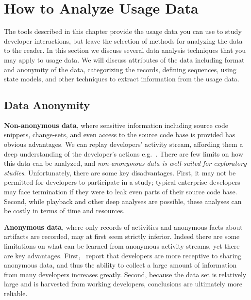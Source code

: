\section{How to Analyze Usage Data}

The tools described in this chapter provide the usage data you can use to study developer interactions, but leave the selection of methods for analyzing the data to the reader.  In this section we discuss several data analysis techniques that you may apply to usage data.  We will discuss attributes of the data including format and anonymity of the data, categorizing the records, defining sequences, using state models, and other techniques to extract information from the usage data. 

\label{sec:dataAnonymity}
\subsection{Data Anonymity}

\noindent
{\bf Non-anonymous data}, where sensitive information including source code snippets, change-sets, and even access to the source code base is provided has obvious advantages. We can replay developers' activity stream, affording them a deep understanding of the developer's actions e.g.~\citep{VakilianETAL2012UseDisuseMisuse}. There are few limits on how this data can be analyzed, and {\em non-anonymous data is well-suited for exploratory studies}. Unfortunately, there are some key disadvantages. First, it may not be permitted for developers to participate in a study; typical enterprise developers may face termination if they were to leak even parts of their source code base. Second, while playback and other deep analyses are possible, these analyses can be costly in terms of time and resources. 

\vspace{0.1in}

\noindent
{\bf Anonymous data}, where only records of activities and anonymous facts about artifacts are recorded, may at first seem strictly inferior. Indeed there are some limitations on what can be learned from anonymous activity streams, yet there are key advantages. First,~\citet{SnipesExperiencesGamifyingSoftwareDevelopment} report that developers are more receptive to sharing anonymous data, and thus the ability to collect a large amount of information from many developers increases greatly. Second, because the data set is relatively large and is harvested from working developers, conclusions are ultimately more reliable. 


